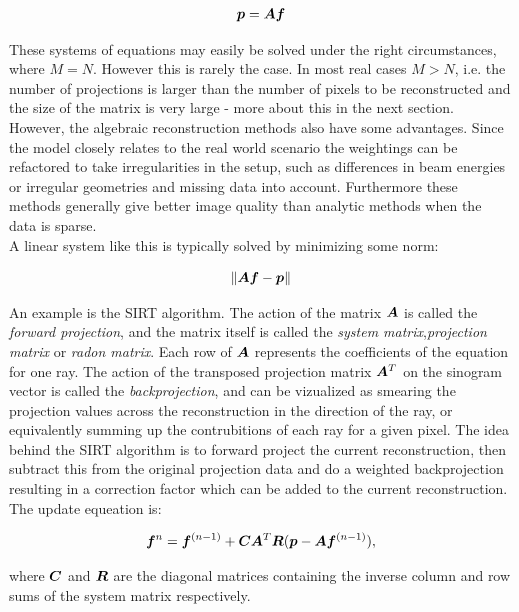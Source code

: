 \begin{align}
\vec{p} = \mat{A}\vec{f}
\end{align}

These systems of equations may easily be solved under the right circumstances, where $M = N$. However this is rarely the case. In most real cases $M > N$, i.e. the number of projections is larger than the number of pixels to be reconstructed and the size of the matrix is very large - more about this in the next section.\\
However, the algebraic reconstruction methods also have some advantages. Since the model closely relates to the real world scenario the weightings can be refactored to take irregularities in the setup, such as differences in beam energies or irregular geometries and missing data into account. Furthermore these methods generally give better image quality than analytic methods when the data is sparse.\\

A linear system like this is typically solved by minimizing some norm:

\begin{align}
\norm{\mat{A}\vec{f}-\vec{p}}
\end{align}

An example is the SIRT algorithm. The action of the matrix $\mat{A}$ is called the \emph{forward projection}, and the matrix itself is called the \emph{system matrix},\emph{projection matrix} or \emph{radon matrix}. Each row of $\mat{A}$ represents the coefficients of the equation for one ray. The action of the transposed projection matrix $\mat{A}^{T}$ on the sinogram vector is called the \emph{backprojection}, and can be vizualized as smearing the projection values across the reconstruction in the direction of the ray, or equivalently summing up the contrubitions of each ray for a given pixel. The idea behind the SIRT algorithm is to forward project the current reconstruction, then subtract this from the original projection data and do a weighted backprojection resulting in a correction factor which can be added to the current reconstruction. The update equeation is:

\begin{align}
\vec{f}^{n} = \vec{f}^{(n-1)}+\mat{C}\mat{A}^{T}\mat{R}(\vec{p}-\mat{A}\vec{f}^{(n-1)}),
\end{align}

where $\mat{C}$ and $\mat{R}$ are the diagonal matrices containing the inverse column and row sums of the system matrix respectively.\\

